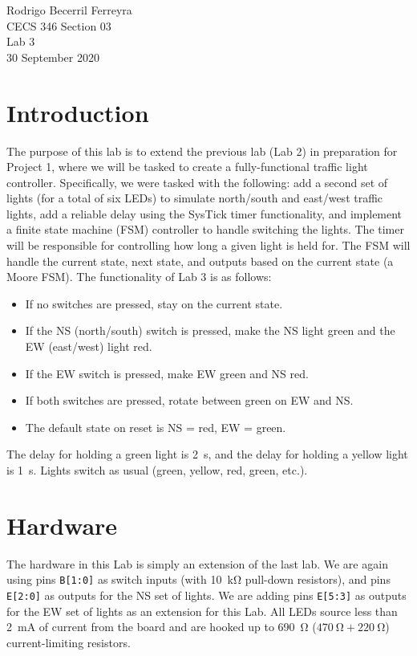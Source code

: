 \documentclass{article}
\renewcommand{\c}[1]{\texttt{#1}}
\begin{document}
    \noindent
    Rodrigo Becerril Ferreyra\\
    CECS 346 Section 03\\
    Lab 3\\
    30 September 2020

\section{Introduction} The purpose of this lab is to extend
the previous lab (Lab 2) in preparation for Project 1, where
we will be tasked to create a fully-functional traffic light
controller. Specifically, we were tasked with the following:
add a second set of lights (for a total of six LEDs) to
simulate north/south and east/west traffic lights,
add a reliable delay using
the SysTick timer functionality, and
implement a finite state machine (FSM) controller to
handle switching the lights. The timer will be responsible
for controlling how long a given light is held for. The
FSM will handle the current state, next state, and outputs
based on the current state (a Moore FSM). The functionality
of Lab 3 is as follows:

\begin{itemize}
    \item If no switches are pressed, stay on the current state.
    \item If the NS (north/south) switch is pressed, make the NS light green and the EW (east/west) light red.
    \item If the EW switch is pressed, make EW green and NS red.
    \item If both switches are pressed, rotate between green on EW and NS.
    \item The default state on reset is NS = red, EW = green.
\end{itemize}

The delay for holding a green light is \SI{2}{s}, and the
delay for holding a yellow light is \SI{1}{s}. Lights switch as
usual (green, yellow, red, green, etc.).

\section{Hardware} The hardware in this Lab is simply an
extension of the last lab. We are again using pins \c{B[1:0]}
as switch inputs (with \SI{10}{\kilo\ohm} pull-down resistors),
and pins \c{E[2:0]} as outputs for the NS set of lights.
We are adding pins \c{E[5:3]} as outputs for the EW set of
lights as an extension for this Lab. All LEDs source less
than \SI{2}{\milli\ampere} of current from the board and
are hooked up to \SI{690}{\ohm} (\(\SI{470}{\ohm}
+ \SI{220}{\ohm}\)) current-limiting resistors.
\end{document}
